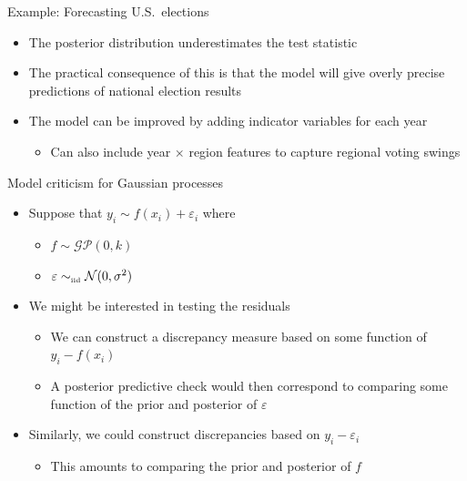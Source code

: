 \begin{frame}{Example: Forecasting U.S.\ elections}
  \begin{itemize}
    \item The posterior distribution underestimates the test statistic
    \vspace{\baselineskip}
    \pause
    \item The practical consequence of this is that the model will give overly precise predictions of national election results
    \vspace{\baselineskip}
    \pause
    \item The model can be improved by adding indicator variables for each year
    \begin{itemize}
      \item Can also include year $\times$ region features to capture regional voting swings
    \end{itemize}
  \end{itemize}
\end{frame}

\begin{frame}{Model criticism for Gaussian processes}
  \begin{itemize}
    \item Suppose that $y_i \sim f(x_i) + \varepsilon_i$ where
    \begin{itemize}
      \item $f \sim \mathcal{GP}(0, k)$
      \item $\varepsilon \sim_{\mbox{\tiny iid}} \mathcal{N}(0, \sigma^2)$
    \end{itemize}
    \vspace{\baselineskip}
    \pause
    \item We might be interested in testing the residuals
    \begin{itemize}
      \pause
      \item We can construct a discrepancy measure based on some function of $y_i - f(x_i)$
      \pause
      \item A posterior predictive check would then correspond to comparing some function of the prior and posterior of $\varepsilon$
    \end{itemize}
    \vspace{\baselineskip}
    \pause
    \item Similarly, we could construct discrepancies based on $y_i - \varepsilon_i$
    \begin{itemize}
      \pause
      \item This amounts to comparing the prior and posterior of $f$
    \end{itemize}
  \end{itemize}
\end{frame}

